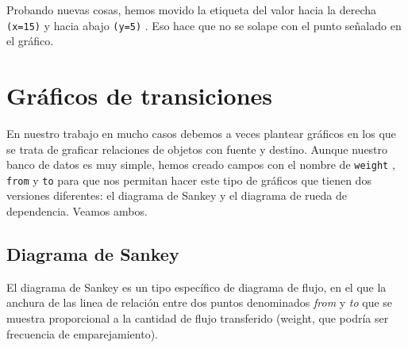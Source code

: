 \documentclass[
]{book}
\newenvironment{Shaded}{\begin{snugshade}}{\end{snugshade}}
\newcommand{\AttributeTok}[1]{\textcolor[rgb]{0.77,0.63,0.00}{#1}}
\newcommand{\ConstantTok}[1]{\textcolor[rgb]{0.00,0.00,0.00}{#1}}
\newcommand{\FunctionTok}[1]{\textcolor[rgb]{0.00,0.00,0.00}{#1}}
\newcommand{\NormalTok}[1]{#1}
\newcommand{\SpecialCharTok}[1]{\textcolor[rgb]{0.00,0.00,0.00}{#1}}
\newcommand{\StringTok}[1]{\textcolor[rgb]{0.31,0.60,0.02}{#1}}
\begin{document}
Probando nuevas cosas, hemos movido la etiqueta del valor hacia la derecha \texttt{(x=15)} y hacia abajo \texttt{(y=5)} . Eso hace que no se solape con el punto señalado en el gráfico.

\hypertarget{gruxe1ficos-de-transiciones}{%
\section{Gráficos de transiciones}\label{gruxe1ficos-de-transiciones}}

En nuestro trabajo en mucho casos debemos a veces plantear gráficos en los que se trata de graficar relaciones de objetos con fuente y destino. Aunque nuestro banco de datos es muy simple, hemos creado campos con el nombre de \texttt{weight} , \texttt{from} y \texttt{to} para que nos permitan hacer este tipo de gráficos que tienen dos versiones diferentes: el diagrama de Sankey y el diagrama de rueda de dependencia. Veamos ambos.

\hypertarget{diagrama-de-sankey}{%
\subsection{Diagrama de Sankey}\label{diagrama-de-sankey}}

El diagrama de Sankey es un tipo específico de diagrama de flujo, en el que la anchura de las linea de relación entre dos puntos denominados \emph{from} y \emph{to} que se muestra proporcional a la cantidad de flujo transferido (weight, que podría ser frecuencia de emparejamiento).

\begin{Shaded}
\end{Shaded}
\end{document}
